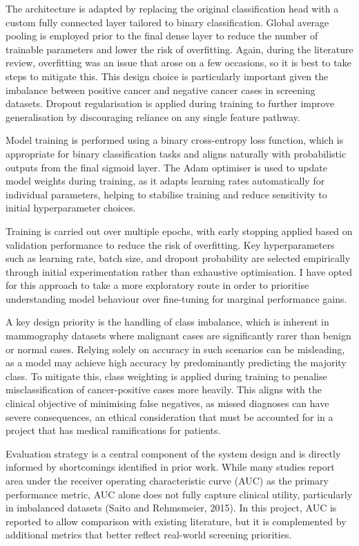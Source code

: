 The architecture is adapted by replacing the original classification head with a custom fully connected layer tailored to binary classification. Global average pooling is employed prior to the final dense layer to reduce the number of trainable parameters and lower the risk of overfitting. Again, during the literature review, overfitting was an issue that arose on a few occasions, so it is best to take steps to mitigate this. This design choice is particularly important given the imbalance between positive cancer and negative cancer cases in screening datasets. Dropout regularisation is applied during training to further improve generalisation by discouraging reliance on any single feature pathway.

Model training is performed using a binary cross-entropy loss function, which is appropriate for binary classification tasks and aligns naturally with probabilistic outputs from the final sigmoid layer. The Adam optimiser is used to update model weights during training, as it adapts learning rates automatically for individual parameters, helping to stabilise training and reduce sensitivity to initial hyperparameter choices.

Training is carried out over multiple epochs, with early stopping applied based on validation performance to reduce the risk of overfitting. Key hyperparameters such as learning rate, batch size, and dropout probability are selected empirically through initial experimentation rather than exhaustive optimisation. I have opted for this approach to take a more exploratory route in order to prioritise understanding model behaviour over fine-tuning for marginal performance gains.

A key design priority is the handling of class imbalance, which is inherent in mammography datasets where malignant cases are significantly rarer than benign or normal cases. Relying solely on accuracy in such scenarios can be misleading, as a model may achieve high accuracy by predominantly predicting the majority class. To mitigate this, class weighting is applied during training to penalise misclassification of cancer-positive cases more heavily. This aligns with the clinical objective of minimising false negatives, as missed diagnoses can have severe consequences, an ethical consideration that must be accounted for in a project that has medical ramifications for patients.

Evaluation strategy is a central component of the system design and is directly informed by shortcomings identified in prior work. While many studies report area under the receiver operating characteristic curve (AUC) as the primary performance metric, AUC alone does not fully capture clinical utility, particularly in imbalanced datasets (Saito and Rehmsmeier, 2015). In this project, AUC is reported to allow comparison with existing literature, but it is complemented by additional metrics that better reflect real-world screening priorities.


